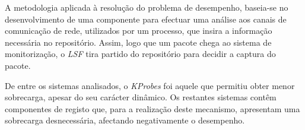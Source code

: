 




%
%


A metodologia aplicada à resolução do problema de desempenho, baseia-se no desenvolvimento de uma componente para efectuar uma análise aos canais de comunicação de rede, utilizados por um processo, que insira a informação necessária no repositório.
Assim, logo que um pacote chega ao sistema de monitorização, o \textit{LSF} tira partido do repositório para decidir a captura do pacote.


De entre os sistemas analisados, o \textit{KProbes} foi aquele que permitiu obter menor sobrecarga, apesar do seu carácter dinâmico.
Os restantes sistemas contêm componentes de registo que, para a realização deste mecanismo, apresentam uma sobrecarga desnecessária, afectando negativamente o desempenho.

